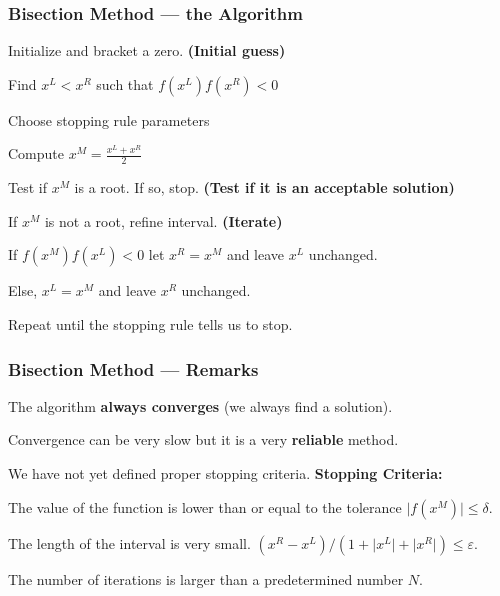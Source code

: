 \documentclass[11pt,xcolor={svgnames},aspectratio=169,usepdftitle=false]{beamer}
\let\toneitemize\itemize
\let\ttwoitemize\enditemize
\renewenvironment{itemize}{\toneitemize\addtolength{\itemsep}{0.7\baselineskip}}{\ttwoitemize}
\let\toneenumer\enumerate
\let\ttwoenumer\endenumerate
\renewenvironment{enumerate}{\toneenumer\addtolength{\itemsep}{0.7\baselineskip}}{\ttwoenumer}
\begin{document}
\begin{frame}
  \frametitle{Bisection Method --- the Algorithm}
  \begin{enumerate}
    \item Initialize and bracket a zero. {\tiny \alert{\textbf{(Initial guess)}}}
    \begin{itemize}
      \item Find $x^L < x^R$ such that $f(x^L)f(x^R) < 0$
      \item Choose stopping rule parameters
    \end{itemize}
    \item Compute $x^M = \frac{x^L + x^R}{2}$
    \item Test if $x^M$ is a root. If so, stop. {\tiny \alert{\textbf{(Test if it is an acceptable solution)}}}
    \item If $x^M$ is not a root, refine interval. {\tiny \alert{\textbf{(Iterate)}}}
    \begin{itemize}
      \item If $f(x^M)f(x^L) < 0$ let $x^R = x^M$ and leave $x^L$ unchanged.
      \item Else, $x^L = x^M$ and leave $x^R$ unchanged.
    \end{itemize}
    \item Repeat until the stopping rule tells us to stop.
  \end{enumerate}
\end{frame}

\begin{frame}
  \frametitle{Bisection Method --- Remarks}
\begin{itemize}
  \item The algorithm \alert{\textbf{always converges}} (we always find a solution).
  \item Convergence can be very slow but it is a very \alert{\textbf{reliable}} method.
  \item We have not yet defined proper stopping criteria.
\end{itemize}
\alert{\textbf{Stopping Criteria:}}
\begin{enumerate}
  \item The value of the function is lower than or equal to the tolerance $\lvert f(x^M) \rvert \leq \delta$.
  \item The length of the interval is very small. $(x^R - x^L) / (1 + \lvert x^L \rvert + \lvert x^R \rvert) \leq \varepsilon$.
  \item The number of iterations is larger than a predetermined number $N$.
\end{enumerate}
\end{frame}
\end{document}
